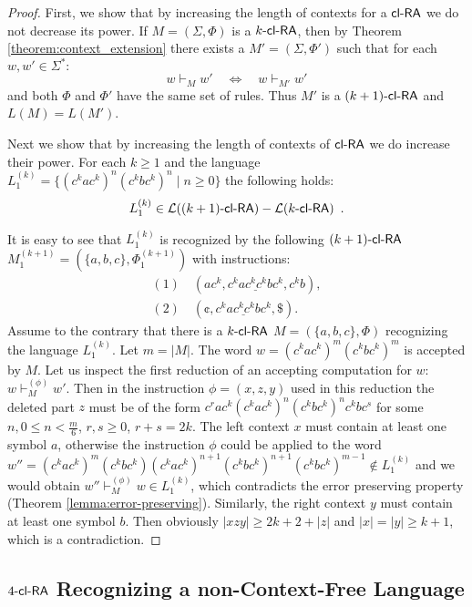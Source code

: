 \begin{proof}
First, we show that by increasing the length of contexts for a $\clRA$ we do not decrease its power. If $M = (\Sigma, \Phi)$ is a $\kclRA$, then by Theorem \ref{theorem:context_extension} there exists a \kCRS[(k+1)] $M' = (\Sigma, \Phi')$ such that for each $w, w' \in \Sigma^*:$
$$w \vdash_M w' \quad \Leftrightarrow \quad w \vdash_{M'} w'$$
and both $\Phi$ and $\Phi'$ have the same set of rules. Thus $M'$ is a $\kclRA[(k+1)]$ and $L(M) = L(M')$.

Next we show that by increasing the length of contexts of $\clRA$ we do increase their power. For each $k\ge 1$ and the language $L_1^{(k)} = \{(c^kac^k)^n(c^kbc^k)^n \mid n \ge 0\}$ the following holds:
$$L_1^{(k)} \in \calL{\kclRA[(k+1)]} - \calL{\kclRA}\enspace.$$

It is easy to see that $L_1^{(k)}$ is recognized by the following $\kclRA[(k+1)]$ $M_1^{(k+1)} = (\{a,b,c\},\Phi_1^{(k+1)})$ with instructions:
$$
\begin{array}{l}
(1) \quad (ac^k, \underline{c^kac^kc^kbc^k}, c^kb),\\
(2) \quad (\cent, \underline{c^kac^kc^kbc^k}, \$).
\end{array}
$$
Assume to the contrary that there is a $\kclRA[k]$ $M=(\{a,b,c\},\Phi)$ recognizing the language $L_1^{(k)}$. Let $m = |M|$. The word $w=(c^kac^k)^m(c^kbc^k)^m$ is accepted by $M$. Let us inspect the first reduction of an accepting computation for $w$: $w \vdash_M^{(\phi)} w'$. Then in the instruction $\phi=(x,z,y)$ used in this reduction the deleted part $z$ must be of the form $c^rac^k(c^kac^k)^n(c^kbc^k)^nc^kbc^s$ for some $n, 0 \le n < \frac{m}{6}$, $r,s \ge 0$, $r+s=2k$. The left context $x$ must contain at least one symbol $a$, otherwise the instruction $\phi$ could be applied to the word $w''=(c^kac^k)^m(c^kbc^k)(c^kac^k)^{n+1}(c^kbc^k)^{n+1}(c^kbc^k)^{m-1} \not\in L_1^{(k)}$ and we would obtain $w'' \vdash_M^{(\phi)} w \in L_1^{(k)}$, which contradicts the error preserving property (Theorem \ref{lemma:error-preserving}). Similarly, the right context $y$ must contain at least one symbol $b$. Then obviously $|xzy| \ge 2k+2 +|z|$ and $|x|=|y| \ge k+1$, which is a contradiction.
\end{proof}

\subsection{$\kclRA[4]$ Recognizing a non-Context-Free Language}\label{4clRA-non-CFL}


